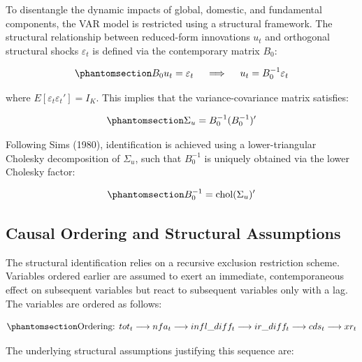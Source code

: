 \documentclass[
  manuscript=article,
  layout=publish,
  year=2026,
  volume=6,
]{den}
\begin{document}
To disentangle the dynamic impacts of global, domestic, and fundamental
components, the VAR model is restricted using a structural framework.
The structural relationship between reduced-form innovations \(u_t\) and
orthogonal structural shocks \(\varepsilon_t\) is defined via the
contemporary matrix \(B_0\):

\begin{equation}\phantomsection\label{eq-svar-relationship}{
B_0 u_t = \varepsilon_t \quad \implies \quad u_t = B_0^{-1} \varepsilon_t
}\end{equation}

where \(E[\varepsilon_t \varepsilon_t'] = I_K\). This implies that the
variance-covariance matrix satisfies:

\begin{equation}\phantomsection\label{eq-sigma-relationship}{
\Sigma_u = B_0^{-1} (B_0^{-1})'
}\end{equation}

Following Sims (1980), identification is achieved using a
lower-triangular Cholesky decomposition of \(\Sigma_u\), such that
\(B_0^{-1}\) is uniquely obtained via the lower Cholesky factor:

\begin{equation}\phantomsection\label{eq-cholesky}{
B_0^{-1} = \text{chol}(\Sigma_u)'
}\end{equation}

\subsection{Causal Ordering and Structural
Assumptions}\label{causal-ordering-and-structural-assumptions}

The structural identification relies on a recursive exclusion
restriction scheme. Variables ordered earlier are assumed to exert an
immediate, contemporaneous effect on subsequent variables but react to
subsequent variables only with a lag. The variables are ordered as
follows:

\begin{equation}\phantomsection\label{eq-ordering}{
\text{Ordering: } tot_t \longrightarrow nfa_t \longrightarrow infl\_diff_t \longrightarrow ir\_diff_t \longrightarrow cds_t \longrightarrow xr_t
}\end{equation}

The underlying structural assumptions justifying this sequence are:
\end{document}
